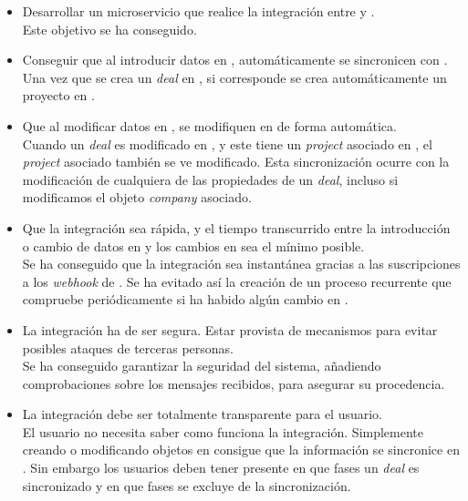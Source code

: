 \begin{itemize}
	\item Desarrollar un microservicio que realice la integración entre \hs{} y \wday{}.\\
	
		Este objetivo se ha conseguido.
	\item Conseguir que al introducir datos en \hs{}, automáticamente se sincronicen con \wday{}.\\
	
	Una vez que se crea un \textit{deal} en \hs{}, si corresponde se crea automáticamente un proyecto en \wday{}.
	
	\item Que al modificar datos en \hs{}, se modifiquen en \wday{} de forma automática.\\
	
	Cuando un \textit{deal} es modificado en \hs{}, y este tiene un \textit{project} asociado en \wday{}, el \textit{project} asociado también se ve modificado. Esta sincronización ocurre con la modificación de cualquiera de las propiedades de un \textit{deal}, incluso si modificamos el objeto \textit{company} asociado.
	
	\item Que la integración sea rápida, y el tiempo transcurrido entre la introducción o cambio de datos en \hs{} y los cambios en \wday{} sea el mínimo posible.\\
	
	Se ha conseguido que la integración sea instantánea gracias a las suscripciones a los \textit{webhook} de \hs{}. 
	Se ha evitado así la creación de un proceso recurrente que compruebe periódicamente si ha habido algún cambio en \hs{}. 
	
	\item La integración ha de ser segura. Estar provista de mecanismos para evitar posibles ataques de terceras personas.\\
	
	Se ha conseguido garantizar la seguridad del sistema, añadiendo comprobaciones sobre los mensajes recibidos, para asegurar su procedencia.
	
	\item La integración debe ser totalmente transparente para el usuario.\\
	
	El usuario no necesita saber como funciona la integración. Simplemente creando o modificando objetos en \hs{} consigue que la información se sincronice en \wday{}.
	Sin embargo los usuarios deben tener presente en que fases un \textit{deal} es sincronizado y en que fases se excluye de la sincronización.
	

\end{itemize}
